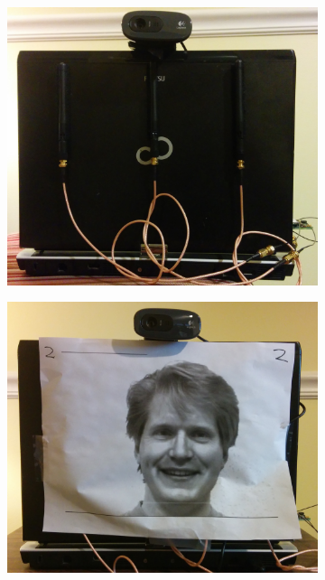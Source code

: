 \documentclass[12pt]{report}
\begin{document}
\begin{figure}[!htb]
    \begin{center}
        \caption{Testbed laptop shown without a printed out picture of a face and with a printed out picture of a face.}
        \label{figure: testbed-pictures}
        \begin{subfigure}[Testbed without face picture attached]{0.3\textwidth}
            \centerline{\includegraphics[scale=0.1]{../images/testbed-without-face.jpg}}
        \end{subfigure}
        \par\bigskip
        \begin{subfigure}[Testbed with face picture attached]{0.3\textwidth}
            \centerline{\includegraphics[scale=0.1]{../images/testbed-with-face.jpg}}
        \end{subfigure}
        \par\bigskip
    \end{center}
\end{figure}
\end{document}
